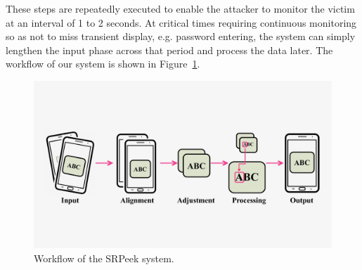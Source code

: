 These steps are repeatedly executed to enable the attacker to monitor the victim at an interval of 1 to 2 seconds. At critical times requiring continuous monitoring so as not to miss transient display, e.g. password entering, the system can simply lengthen the input phase across that period and process the data later. The workflow of our system is shown in Figure~\ref{fig-workflow}.
\begin{figure}
  \centering
     \includegraphics[width=0.90\linewidth]{./pic/workflow_cl.pdf}
     \caption{Workflow of the \textsf{SRPeek} system.}
     \label{fig-workflow}
\end{figure}


